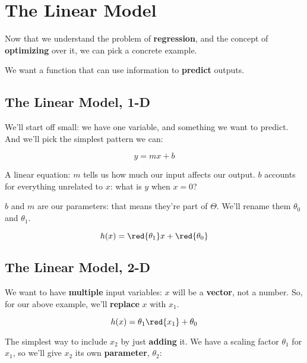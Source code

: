 \section*{The Linear Model}

    Now that we understand the problem of \textbf{regression}, and the concept of \textbf{optimizing} over it, we can pick a concrete example.
    
    We want a function that can use information to \textbf{predict} outputs.
    
    \subsection*{The Linear Model, 1-D}
    
        We'll start off small: we have one variable, and something we want to predict. And we'll pick the simplest pattern we can:

        \begin{equation}
            y = mx+b
        \end{equation}
        
        A linear equation: $m$ tells us how much our input affects our output. $b$ accounts for everything unrelated to $x$: what is $y$ when $x=0$?
        
        $b$ and $m$ are our parameters: that means they're part of $\Theta$. We'll rename them $\theta_0$ and $\theta_1$. 
        
        \begin{equation}
            h(x) = \red{\theta_1} x + \red{\theta_0}
        \end{equation}
        
    \subsection*{The Linear Model, 2-D}
    
        We want to have \textbf{multiple} input variables: $x$ will be a \textbf{vector}, not a number. So, for our above example, we'll \textbf{replace} $x$ with $x_1$.
        
        \begin{equation}
            h(x) = \theta_1 \red{x_1} + \theta_0
        \end{equation}
        
        The simplest way to include $x_2$ by just \textbf{adding} it. We have a scaling factor $\theta_1$ for $x_1$, so we'll give $x_2$ its own \textbf{parameter}, $\theta_2$:
        
